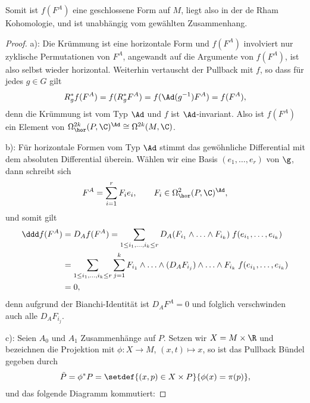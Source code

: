 \documentclass[%
	paper=a5,%
	fleqn,%
	DIV=18,%
	BCOR=0mm,
	fontsize=11pt,
	titlepage=false,%
	bibliography=totoc,
	DIV=18,%
	twoside=true,
	pdftitle=Riemannsche Geometrie,
	pdfauthor=Uwe Semmelmann,
	numbers=noendperiod]%
	{scrbook}
\begin{document}
Somit ist $f(F^A)$ eine geschlossene Form auf $M$, liegt also in der de Rham
Kohomologie, und ist unabhängig vom gewählten Zusammenhang.

\begin{proof}
a): Die Krümmung ist eine horizontale Form und $f(F^A)$ involviert nur zyklische
Permutationen von $F^A$, angewandt auf die Argumente von $f(F^A)$, ist also
selbst wieder horizontal. Weiterhin vertauscht der Pullback mit $f$, so dass für
jedes $g\in G$ gilt
\begin{align*}
R_g^*f(F^A) = f(R_g^* F^A) = f(\Ad(g^{-1})F^A) = f(F^A), 
\end{align*}
denn die Krümmung ist vom Typ $\Ad$ und $f$ ist $\Ad$-invariant. Also ist
$f(F^A)$ ein Element von $\Omega^{2k}_\hor(P,\C)^{\Ad}\cong \Omega^{2k}(M,\C)$.

b): Für horizontale Formen vom Typ $\Ad$ stimmt das gewöhnliche Differential mit
dem absoluten Differential überein. Wählen wir eine Basis $(e_1,\ldots,e_r)$ von
$\g$, dann schreibt sich
\begin{align*}
F^A = \sum_{i=1}^r F_i e_i,\qquad F_i\in \Omega_\hor^2(P,\C)^{\Ad},
\end{align*}
und somit gilt
\begin{align*}
\ddd f(F^A) &= D_A f(F^A)
=  \sum_{1\le i_1,\ldots,i_k \le r} D_A(F_{i_1}\wedge \ldots \wedge F_{i_k})\;
f(e_{i_1},\ldots,e_{i_k})\\
&= 
\sum_{1\le i_1,\ldots,i_k \le r} \sum_{j=1}^k F_{i_1}\wedge \ldots\wedge (D_A
F_{i_j}) \wedge \ldots \wedge F_{i_k}\; f(e_{i_1},\ldots,e_{i_k})\\
&=0,
\end{align*}
denn aufgrund der Bianchi-Identität ist $D_A F^A = 0$ und folglich verschwinden
auch alle $D_A F_{i_j}$.

c): Seien $A_0$ und $A_1$ Zusammenhänge auf $P$. Setzen wir $X= M\times \R$ und
bezeichnen die Projektion mit
$\phi\colon X\to M$, $(x,t)\mapsto x$,
so ist das Pullback Bündel gegeben durch
\begin{align*}
\tilde{P} = \phi^*P = \setdef{(x,p)\in X\times P}{\phi(x)=\pi(p)},
\end{align*}
und das folgende Diagramm kommutiert:

{

\centering


}
\end{proof}
\end{document}
